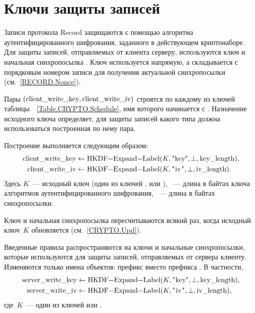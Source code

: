 \section{Ключи защиты записей}\label{CRYPTO.TKeys}

Записи протокола Record защищаются с помощью алгоритма аутентифицированного 
шифрования, заданного в действующем криптонаборе.
%
Для защиты записей, отправляемых от клиента серверу, используются
ключ  и начальная синхропосылка . 
Ключ используется напрямую, а  складывается с порядковым 
номером записи для получения актуальной синхропосылки (см.~\ref{RECORD.Nonce}).

Пары $(\code{client_write_key},\code{client_write_iv})$ строятся по каждому из 
ключей таблицы~~\ref{Table.CRYPTO.Schedule}, имя которого начинается с 
. Назначение исходного ключа определяет, для защиты записей какого 
типа должна использоваться построенная по нему пара.  

Построение выполняется следующим образом:
\begin{align*}
\code{client_write_key}&\gets
\code{HKDF-Expand-Label}(K, \str{key}, \perp, \code{key_length}),\\
\code{client_write_iv}&\gets
\code{HKDF-Expand-Label}(K, \str{iv}, \perp, \code{iv_length}).
\end{align*}
Здесь $K$~--- исходный ключ (один из ключей , 
 или ), 
~--- длина в байтах ключа алгоритмов аутентифицированного 
шифрования, ~--- длина в байтах синхропосылки.

Ключ и начальная синхропосылка пересчитываются всякий раз, когда исходный 
ключ~$K$ обновляется (см.~\ref{CRYPTO.Upd}).

Введенные правила распространяются на ключи и начальные синхропосылки, 
которые используются для защиты записей, отправляемых от сервера клиенту.
Изменяются только имена объектов: префикс  вместо префикса 
.
%
В частности, 
\begin{align*}
\code{server_write_key}&\gets
\code{HKDF-Expand-Label}(K, \str{key}, \perp, \code{key_length}),\\
\code{server_write_iv}&\gets
\code{HKDF-Expand-Label}(K, \str{iv}, \perp, \code{iv_length}),
\end{align*}
где~$K$~--- один из ключей  или 
.

